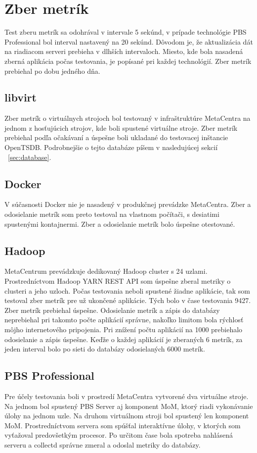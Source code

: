 \documentclass[printed,11pt,twoside,color,cover,table]{fithesis3}
\begin{document}
\section{Zber metrík}
Test zberu metrík sa odohrával v intervale 5 sekúnd, v prípade technológie PBS Professional bol interval nastavený na 20 sekúnd.
Dôvodom je, že aktualizácia dát na riadiacom serveri prebieha v dlhších intervaloch. Miesto, kde bola nasadená zberná aplikácia počas testovania,
je popísané pri každej technológií. Zber metrík prebiehal po dobu jedného dňa.

\subsection{libvirt}
Zber metrík o virtuálnych strojoch bol testovaný v infraštruktúre MetaCentra na jednom z hosťujúcich strojov, kde boli spustené
virtuálne stroje. Zber metrík prebiehal podľa očakávaní a úspešne boli ukladané do testovacej inštancie OpenTSDB. Podrobnejšie o tejto
databáze píšem v nasledujúcej sekcií ~\ref{sec:database}.

\subsection{Docker}
V súčasnosti Docker nie je nasadený v produkčnej prevádzke MetaCentra. Zber a odosielanie metrík som preto testoval na vlastnom počítači,
s desiatimi spustenými kontajnermi. Zber a odosielanie metrík bolo úspešne otestované.

\subsection{Hadoop}
MetaCentrum prevádzkuje dedikovaný Hadoop cluster s 24 uzlami. Prostredníctvom Hadoop YARN REST API som úspešne zberal metriky o
clusteri a jeho uzloch. Počas testovania neboli spustené žiadne aplikácie, tak som testoval zber metrík pre už ukončené aplikácie.
Tých bolo v čase testovania 9427. Zber metrík prebiehal úspešne. Odosielanie metrík a zápis do databázy neprebiehal pri takomto počte aplikácií správne,
nakoľko limitom bola rýchlosť môjho internetového pripojenia. Pri znížení počtu aplikácií na 1000 prebiehalo odosielanie a zápis
úspešne. Keďže o každej aplikácií je zberaných 6 metrík, za jeden interval bolo po sieti do databázy odosielaných 6000 metrík.

\subsection{PBS Professional}
Pre účely testovania boli v prostredí MetaCentra vytvorené dva virtuálne stroje. Na jednom bol spustený PBS Server aj komponent MoM,
ktorý riadi vykonávanie úlohy na jednom uzle. Na druhom virtuálnom stroji bol spustený len komponent MoM. Prostredníctvom servera
som spúšťal interaktívne úlohy, v ktorých som vyťažoval predovšetkým procesor. Po určitom čase bola spotreba nahlásená serveru a 
collectd správne zmeral a odoslal metriky do databázy.
\end{document}
